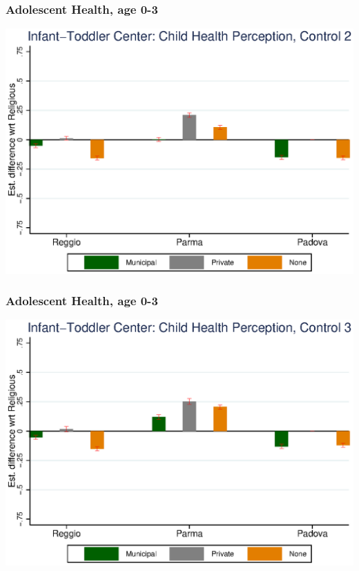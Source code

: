 \documentclass{beamer}
\begin{document}
\begin{frame}\frametitle{Adolescent Health, age 0-3}
\center
\includegraphics[scale=0.7]{../Output/graphs/CH_Asilo_Adol_inter.eps}
\end{frame}

\begin{frame}\frametitle{Adolescent Health, age 0-3}
\center
\includegraphics[scale=0.7]{../Output/graphs/CH_Asilo_Adol_right.eps}
\end{frame}
\end{document}
